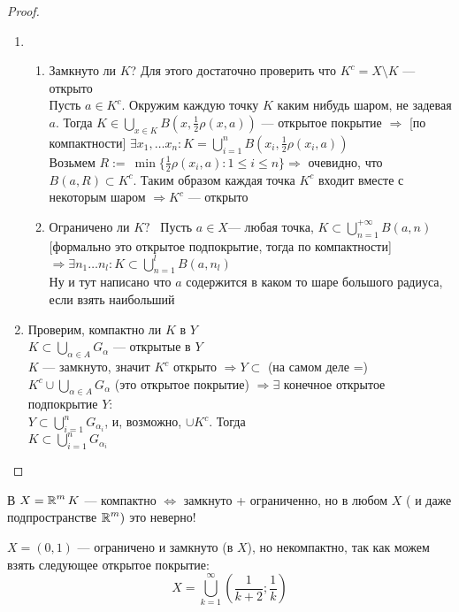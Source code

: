 	\begin{proof} \nobreakspace
		\begin{enumerate}
		\item	
			\begin{enumerate}
			\item  Замкнуто ли $K$? Для этого достаточно проверить что $K^c = X \setminus K$ --- открыто \\
			Пусть $a \in K^c$. Окружим каждую точку $K$ каким нибудь шаром, не задевая $a$. Тогда $K \in \bigcup\limits_{x \in K}B\left(x, \frac{1}{2}\rho(x,a)\right)$ --- открытое покрытие $\Rightarrow$ [по компактности] $\exists x_1, \ldots x_n : K = \bigcup\limits_{i=1}^{n}B(x_i, \frac{1}{2} \rho(x_i, a))$ \\
			Возьмем $R:=\ \min\{\frac{1}{2}\rho(x_i, a): 1 \le i \le n \} \Rightarrow$ очевидно, что $B(a, R) \subset K^c$. Таким образом каждая точка $K^c$ входит вместе с некоторым шаром $\Rightarrow K^c$ --- открыто \\
			\item  Ограничено ли $K?$ \ Пусть $a \in X$--- любая точка, $K \subset \bigcup\limits_{n=1}^{+\infty} B(a,n)$ [формально это открытое подпокрытие, тогда по компактности] $\Rightarrow \exists n_1 \ldots n_l: K \subset \bigcup\limits_{n=1}^{l}B(a, n_l)$ \\
			Ну и тут написано что $a$ содержится в каком то шаре большого радиуса, если взять наибольший
		\end{enumerate}
		\item Проверим, компактно ли $K$ в $Y$\\
		$K \subset \bigcup\limits_{\alpha \in A} G_\alpha$ --- открытые в $Y$ \\
		$K$ --- замкнуто, значит $K^c$ открыто $\Rightarrow Y \subset $ (на самом деле =) $K^c \cup \bigcup\limits_{\alpha \in A} G_\alpha$ (это открытое покрытие) $\Rightarrow \exists$ конечное открытое подпокрытие $Y$: \\
		$Y \subset \bigcup\limits_{i=1}^n G_{\alpha_i} $, и, возможно, $\cup  K^c$. Тогда \\
		$K \subset \bigcup\limits_{i=1}^n G_{\alpha_i} $
		\end{enumerate}
	\end{proof}
	
	\begin{remark}
	В $X = \operatorname*{\mathbb{R}}^m K$ --- компактно $\Leftrightarrow $ замкнуто + ограниченно, но в любом $X$ ( и даже подпространстве $\operatorname*{\mathbb{R}}^m)$ это неверно! 	
		\begin{example}
		$X = (0,1)$ --- ограничено и замкнуто (в $X$), но некомпактно, так как можем взять следующее открытое покрытие: 
		$$X = \bigcup_{k = 1}^{\infty} \left(\frac{1}{k+2}; \frac{1}{k}\right)$$	
		\end{example}
	\end{remark}
	
